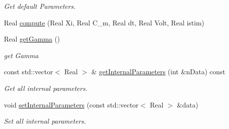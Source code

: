\begin{DoxyCompactItemize}
\begin{DoxyCompactList}\small\item\em Get default Parameters. \item\end{DoxyCompactList}\item 
Real \hyperlink{classvoom_1_1_mahajan_af69275575333c5b53c6485b090f77041}{compute} (Real Xi, Real C\_\-m, Real dt, Real Volt, Real istim)
\item 
\hypertarget{classvoom_1_1_mahajan_a909c20c75a95d45e00ead8930b4b3287}{
Real \hyperlink{classvoom_1_1_mahajan_a909c20c75a95d45e00ead8930b4b3287}{getGamma} ()}
\label{classvoom_1_1_mahajan_a909c20c75a95d45e00ead8930b4b3287}

\begin{DoxyCompactList}\small\item\em get Gamma \item\end{DoxyCompactList}\item 
\hypertarget{classvoom_1_1_mahajan_acc87e8590aeb8084f3cf405cc133d7e2}{
const std::vector$<$ Real $>$ \& \hyperlink{classvoom_1_1_mahajan_acc87e8590aeb8084f3cf405cc133d7e2}{getInternalParameters} (int \&nData) const }
\label{classvoom_1_1_mahajan_acc87e8590aeb8084f3cf405cc133d7e2}

\begin{DoxyCompactList}\small\item\em Get all internal parameters. \item\end{DoxyCompactList}\item 
\hypertarget{classvoom_1_1_mahajan_ac058220f26b840aff44940270a223e16}{
void \hyperlink{classvoom_1_1_mahajan_ac058220f26b840aff44940270a223e16}{setInternalParameters} (const std::vector$<$ Real $>$ \&data)}
\label{classvoom_1_1_mahajan_ac058220f26b840aff44940270a223e16}

\begin{DoxyCompactList}\small\item\em Set all internal parameters. \item\end{DoxyCompactList}\end{DoxyCompactItemize}



